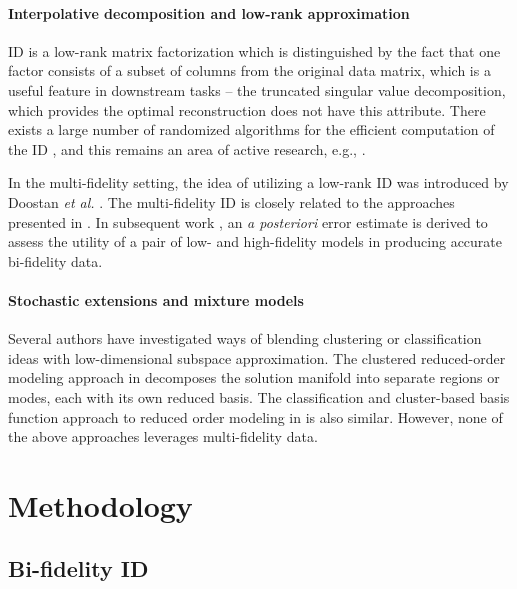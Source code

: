 \documentclass[preprint,10pt]{elsarticle}
\begin{document}
\paragraph{Interpolative decomposition and low-rank approximation} ID is a low-rank matrix factorization which is distinguished by the fact that one factor consists of a subset of columns from the original data matrix, which is a useful feature in downstream tasks -- the truncated singular value decomposition, which provides the optimal reconstruction \cite{eckart1936approximation} does not have this attribute. There exists a large number of randomized algorithms for the efficient computation of the ID \cite{liberty2007randomized}, and this remains an area of active research, e.g., \cite{dong2023robust}.

In the multi-fidelity setting, the idea of utilizing a low-rank ID was introduced by Doostan \emph{et al.} \cite{doostan2016bi}. The multi-fidelity ID is closely related to the approaches presented in \cite{doostan2007stochastic,narayan2014stochastic,newberry2022bi}. In subsequent work \cite{hampton2018}, an {\it a posteriori} error estimate is derived to assess the utility of a pair of low- and high-fidelity models in producing accurate bi-fidelity data. 


\paragraph{Stochastic extensions and mixture models} 

Several authors have investigated ways of blending clustering or classification ideas with low-dimensional subspace approximation. The clustered reduced-order modeling approach in \cite{kaiser2014cluster} decomposes the solution manifold into separate regions or modes, each with its own reduced basis. The classification and cluster-based basis function approach to reduced order modeling in \cite{xiong2022pre} is also similar. However, none of the above approaches leverages multi-fidelity data.



\section{Methodology}
\label{sec:method}



\subsection{Bi-fidelity ID}
\label{sec:bf_id}
\end{document}
